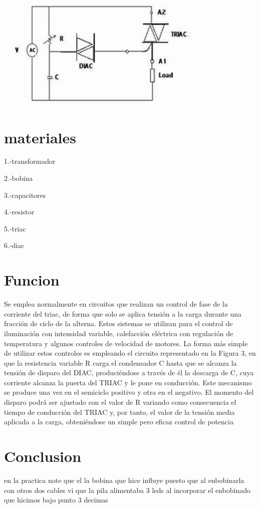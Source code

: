\documentclass[12pt,a4paper]{article}
\begin{document}
\begin{flushleft}
\includegraphics[width=10cm]{1.jpg} 
\end{flushleft}
\section{materiales}

\begin{flushleft}
1.-transformador
\end{flushleft}
\begin{flushleft}
2.-bobina
\end{flushleft}
\begin{flushleft}
3.-capacitores
\end{flushleft}
\begin{flushleft}
4.-resistor
\end{flushleft}
\begin{flushleft}
5.-triac
\end{flushleft}
\begin{flushleft}
6.-diac
\end{flushleft}
\section{Funcion}

\begin{flushleft}
 Se emplea normalmente en circuitos que realizan un control de fase de la corriente del triac, de forma que solo se aplica tensión a la carga durante una fracción de ciclo de la alterna. Estos sistemas se utilizan para el control de iluminación con intensidad variable, calefacción eléctrica con regulación de temperatura y algunos controles de velocidad de motores.
 La forma más simple de utilizar estos controles es empleando el circuito representado en la Figura 3, en que la resistencia variable R carga el condensador C hasta que se alcanza la tensión de disparo del DIAC, produciéndose a través de él la descarga de C, cuya corriente alcanza la puerta del TRIAC y le pone en conducción. Este mecanismo se produce una vez en el semiciclo positivo y otra en el negativo. El momento del disparo podrá ser ajustado con el valor de R variando como consecuencia el tiempo de conducción del TRIAC y, por tanto, el valor de la tensión media aplicada a la carga, obteniéndose un simple pero eficaz control de potencia
\end{flushleft}
\section{Conclusion}
\begin{flushleft}
en la practica note que el la bobina que hice influye puesto que al enbobinarla con otros dos cables vi que la pila alimentaba 3 leds al incorporar el enbobinado que hicimos bajo punto 3 decimas
\end{flushleft}
\end{document}

